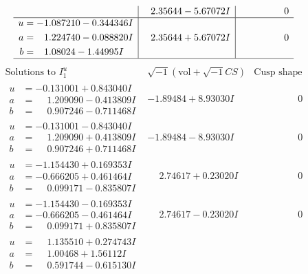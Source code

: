 \documentclass[1p]{elsarticle_modified}
\theoremstyle{definition}
\newcommand{\I}{\sqrt{-1}}
\begin{document}
$$\begin{array}{c|c|c}
 & \phantom{-}2.35644 - 5.67072 I & \phantom{-0.000000 } 0 \\ \hline\begin{aligned}
u &= -1.087210 - 0.344346 I \\
a &= \phantom{-}1.224740 - 0.088820 I \\
b &= \phantom{-}1.08024 - 1.44995 I\end{aligned}
 & \phantom{-}2.35644 + 5.67072 I & \phantom{-0.000000 } 0\\
 \hline 
 \end{array}$$\newpage$$\begin{array}{c|c|c}  
\text{Solutions to }I^u_{1}& \I (\text{vol} + \sqrt{-1}CS) & \text{Cusp shape}\\
 \hline 
\begin{aligned}
u &= -0.131001 + 0.843040 I \\
a &= \phantom{-}1.209090 - 0.413809 I \\
b &= \phantom{-}0.907246 - 0.711468 I\end{aligned}
 & -1.89484 + 8.93030 I & \phantom{-0.000000 } 0 \\ \hline\begin{aligned}
u &= -0.131001 - 0.843040 I \\
a &= \phantom{-}1.209090 + 0.413809 I \\
b &= \phantom{-}0.907246 + 0.711468 I\end{aligned}
 & -1.89484 - 8.93030 I & \phantom{-0.000000 } 0 \\ \hline\begin{aligned}
u &= -1.154430 + 0.169353 I \\
a &= -0.666205 + 0.461464 I \\
b &= \phantom{-}0.099171 - 0.835807 I\end{aligned}
 & \phantom{-}2.74617 + 0.23020 I & \phantom{-0.000000 } 0 \\ \hline\begin{aligned}
u &= -1.154430 - 0.169353 I \\
a &= -0.666205 - 0.461464 I \\
b &= \phantom{-}0.099171 + 0.835807 I\end{aligned}
 & \phantom{-}2.74617 - 0.23020 I & \phantom{-0.000000 } 0 \\ \hline\begin{aligned}
u &= \phantom{-}1.135510 + 0.274743 I \\
a &= \phantom{-}1.00468 + 1.56112 I \\
b &= \phantom{-}0.591744 - 0.615130 I\end{aligned}

\end{array}$$
\end{document}
